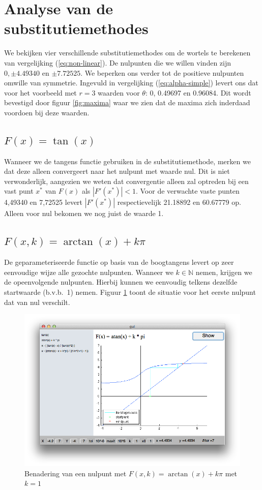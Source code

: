 \documentclass[12pt,a4paper]{article}
\begin{document}
\section{Analyse van de substitutiemethodes}

We bekijken vier verschillende substitutiemethodes om de wortels te berekenen van vergelijking (\ref{eq:non-linear}). De nulpunten die we willen vinden zijn $0, \pm4.49340$ en $\pm7.72525$. We beperken ons verder tot de positieve nulpunten omwille van symmetrie. Ingevuld in vergelijking (\ref{eq:alpha-simple}) levert ons dat voor het voorbeeld met $r=3$ waarden voor $\theta$: 0, 0.49697 en 0.96084. Dit wordt bevestigd door figuur \ref{fig:maxima} waar we zien dat de maxima zich inderdaad voordoen bij deze waarden.

\subsection{$F(x) = \tan(x)$}

Wanneer we de tangens functie gebruiken in de substitutiemethode, merken we dat deze alleen convergeert naar het nulpunt met waarde nul. Dit is niet verwonderlijk, aangezien we weten dat convergentie alleen zal optreden bij een vast punt $x^*$ van $F(x)$ als $|F'(x^*)| < 1$. Voor de verwachte vaste punten 4,49340 en 7,72525 levert $|F'(x^*)|$ respectievelijk 21.18892 en 60.67779 op. Alleen voor nul bekomen we nog juist de waarde 1.

\subsection{$F(x,k) = \arctan(x) + k\pi$}

De geparameteriseerde functie op basis van de boogtangens levert op zeer eenvoudige wijze alle gezochte nulpunten. Wanneer we $k \in \mathbb{N}$ nemen, krijgen we de opeenvolgende nulpunten. Hierbij kunnen we eenvoudig telkens dezelfde startwaarde (b.v.b.\ 1) nemen. Figuur \ref{fig:arctan} toont de situatie voor het eerste nulpunt dat van nul verschilt.

\begin{figure}
\begin{center}
 \includegraphics[width=120mm]{resources/arctan.png}
 \caption{Benadering van een nulpunt met $F(x,k) = \arctan(x) + k\pi$ met $k=1$}
  \label{fig:arctan}
\end{center}
\end{figure}
\end{document}
